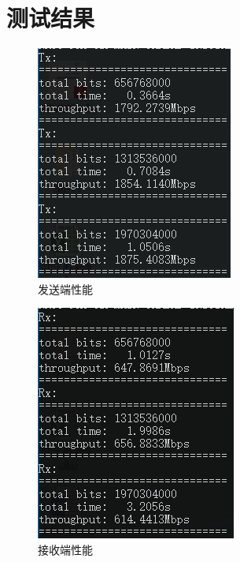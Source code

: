 \documentclass{article}
\begin{document}
\section{测试结果}
\begin{figure}[H]
	\centering
	\includegraphics[width = .4\textwidth]{tx42.png}
	\caption{发送端性能}
\end{figure}
\begin{figure}[H]
	\centering
	\includegraphics[width = .4\textwidth]{rx414.png}
	\caption{接收端性能}
\end{figure}
\end{document}
